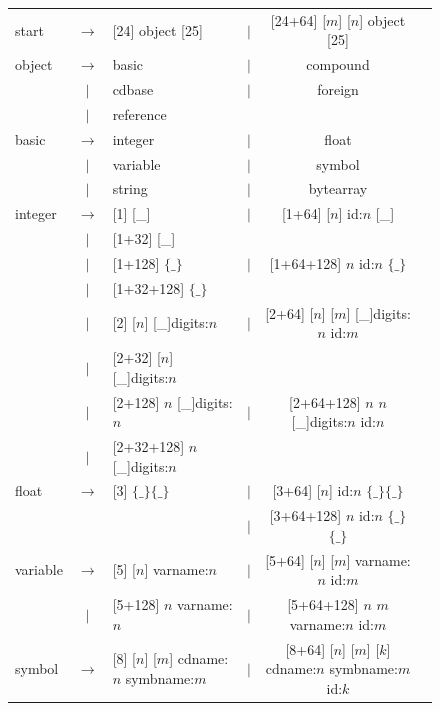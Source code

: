 \documentclass{report}
\begin{document}
\def\abyte{[\_]}\def\fourbytes{\ensuremath{\{\_\}}}
\begin{figure}\centering\footnotesize
\begin{center}
\begin{tabular}{lcp{6cm}lcp{5cm}}
  start  &  $\longrightarrow$& [24] object [25] 
           &  $|$ &  [24+64] [$m$]  [$n$] object [25]\\
   object  & $\longrightarrow$& basic
      & $|$ &  compound &\\
      & $|$ & cdbase
      & $|$ & foreign \\
      & $|$ & reference &\\
    basic & $\longrightarrow$ &  integer  
      & $|$ &  float \\
      & $|$ &  variable 
      & $|$ &  symbol   \\
      & $|$ &  string 
      & $|$ &  bytearray \\
    integer  & $\longrightarrow$&[1] \abyte 
      & $|$ & [1+64] [$n$] id:$n$ \abyte\\
      & $|$ &  [1+32] \abyte  & &  \\
      & $|$ &  [1+128] \fourbytes 
      &  $|$ & [1+64+128] {$n$} id:$n$ \fourbytes\\
      & $|$ &  [1+32+128] \fourbytes  &
      &  &\\
      & $|$ &  [2] [$n$] \abyte digits:$n$
      & $|$ & [2+64] [$n$] [$m$] \abyte digits:$n$ id:$m$\\
      & $|$ & [2+32] [$n$] \abyte digits:$n$ & 
      &  \\
      & $|$ & [2+128] {$n$} \abyte digits:$n$
      & $|$ & [2+64+128] {$n$} {$n$} \abyte digits:$n$ id:$n$\\
      & $|$ & [2+32+128] {$n$} \abyte digits:$n$
      & & \\
   float  & $\longrightarrow$& [3] \fourbytes\fourbytes 
       & $|$ & [3+64] [$n$] id:$n$ \fourbytes\fourbytes\\
       & &
       & $|$ & [3+64+128] {$n$} id:$n$ \fourbytes\fourbytes\\
    variable  & $\longrightarrow$& [5] [$n$] varname:$n$
       & $|$ & [5+64] [$n$] [$m$] varname:$n$ id:$m$\\
       & $|$ & [5+128] {$n$} varname:$n$
       & $|$ & [5+64+128] {$n$} {$m$} varname:$n$ id:$m$\\
    symbol & $\longrightarrow$& [8] [$n$] [$m$] cdname:$n$ symbname:$m$
       & $|$ & [8+64] [$n$] [$m$] [$k$] cdname:$n$ symbname:$m$ id:$k$\\

\end{tabular}
\end{center}
\end{figure}
\end{document}
